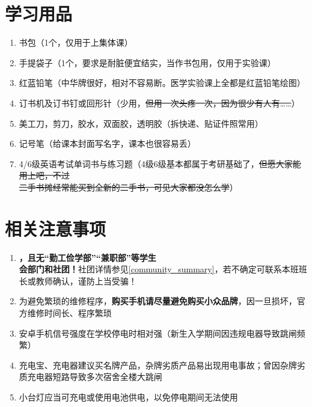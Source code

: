 \section[学习用品]{学习用品}
\begin{enumerate}
    \item 书包（1个，仅用于上集体课）
    \item 手提袋子（1个，要求是耐脏便宜结实，当作书包用，仅用于实验课）
    \item 红蓝铅笔（中华牌很好，相对不容易断。医学实验课上全都是红蓝铅笔绘图）
    \item 订书机及订书钉或回形针（少用，\sout{但用一次头疼一次，因为很少有人有……}）
    \item 美工刀，剪刀，胶水，双面胶，透明胶（拆快递、贴证件照常用）
    \item 记号笔（给课本封面写名字，课本也很容易丢）
    \item 4/6级英语考试单词书与练习题（4级6级基本都属于考研基础了，\sout{但愿大家能用上吧，不过\\二手书摊经常能买到全新的二手书，可见大家都没怎么学}）
\end{enumerate}

\section[相关注意事项]{相关注意事项}
\begin{enumerate}
    \item \textbf{，且无“勤工俭学部”“兼职部”等学生\\会部门和社团！}社团详情参见\uline{\ref{community_summary}}，若不确定可联系本班班长或教师确认，谨防上当受骗！
    \item 为避免繁琐的维修程序，\textbf{购买手机请尽量避免购买小众品牌}，因一旦损坏，官方维修时间长、程序繁琐
    \item 安卓手机信号强度在学校停电时相对强（新生入学期间因违规电器导致跳闸频繁）
    \item 充电宝、充电器建议买名牌产品，杂牌劣质产品易出现用电事故；曾因杂牌劣质充电器短路导致多次宿舍全楼大跳闸
    \item 小台灯应当可充电或使用电池供电，以免停电期间无法使用
\end{enumerate}